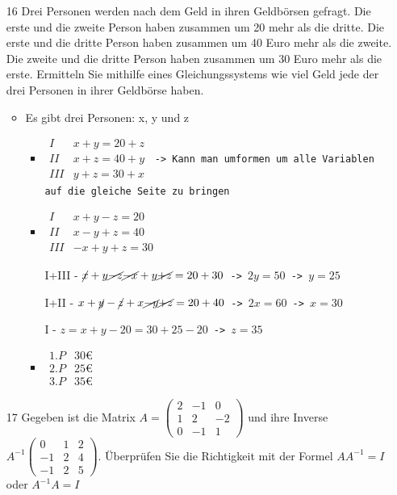 \documentclass{article}
\begin{document}
\begin{itemize}
\begin{itemize}
		\end{itemize}
		\item[16]{Drei Personen werden nach dem Geld in ihren Geldbörsen gefragt. Die erste und die zweite Person haben zusammen um 20 mehr als die dritte. Die erste und die dritte Person haben zusammen um 40 Euro mehr als die zweite. Die zweite und die dritte Person haben zusammen um 30 Euro mehr als die erste. Ermitteln Sie mithilfe eines Gleichungssystems wie viel Geld jede der drei Personen in ihrer Geldbörse haben.}
		\begin{itemize}
			\item{Es gibt drei Personen: x, y und z}
			\begin{itemize}
				\item{$\begin{matrix} I & x+y=20+z \\ II & x+z=40+y \\ III & y+z=30+x \end{matrix}$\texttt{ -> Kann man umformen um alle Variablen auf die gleiche Seite zu bringen}}
				\item{$\begin{matrix} I & x+y-z=20 \\ II & x-y+z=40 \\ III & -x+y+z=30 \end{matrix}$}
				\item[I+III - ]{$\cancel{x}+y\cancel{-z}\cancel{-x}+y\cancel{+z}=20+30$\texttt{ -> }$2y=50$\texttt{ -> }$y=25$}
				\item[I+II - ]{$x+\cancel{y}-\cancel{z}+x\cancel{-y}\cancel{+z}=20+40$\texttt{ -> }$2x=60$\texttt{ -> }$x=30$}
				\item[I - ]{$z=x+y-20=30+25-20$\texttt{ -> }$z=35$}
				\item{$\begin{matrix} 1.P & 30€ \\ 2.P & 25€ \\ 3.P & 35€ \end{matrix}$}
			\end{itemize}
		\end{itemize}
		\item[17]{Gegeben ist die Matrix $A=\begin{pmatrix} 2 & -1 & 0 \\ 1 & 2 & -2 \\ 0 & -1 & 1 \end{pmatrix}$ und ihre Inverse $A^{-1}\begin{pmatrix} 0 & 1 & 2 \\ -1 & 2 & 4 \\ -1 & 2 & 5 \end{pmatrix}$. Überprüfen Sie die Richtigkeit mit der Formel $AA^{-1}=I$ oder $A^{-1}A=I$}

\end{itemize}
\end{document}
